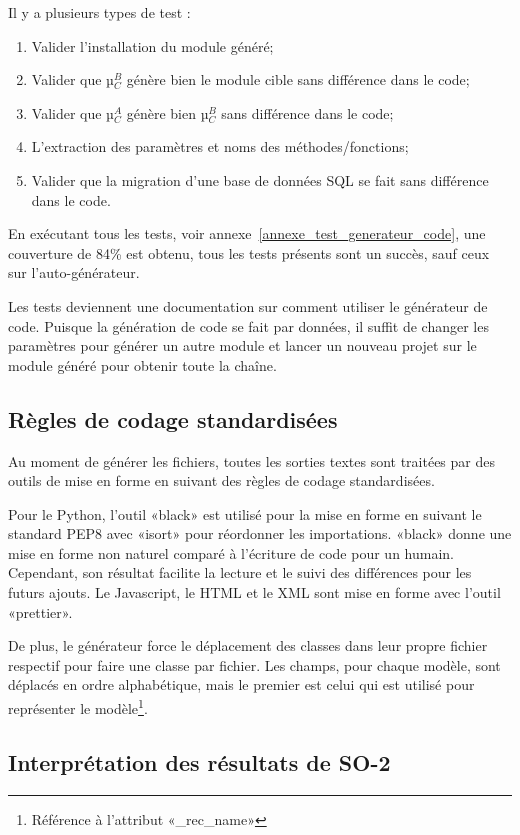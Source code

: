 Il y a plusieurs types de test : 
\begin{enumerate}
    \item Valider l’installation du module généré;
    \item Valider que µ$_C^B$ génère bien le module cible sans différence dans le code;
    \item Valider que µ$_C^A$ génère bien µ$_C^B$ sans différence dans le code;
    \item L’extraction des paramètres et noms des méthodes/fonctions;
    \item Valider que la migration d’une base de données SQL se fait sans différence dans le code.
\end{enumerate}

En exécutant tous les tests, voir annexe~\ref{annexe_test_generateur_code}, une couverture de 84\% est obtenu, tous les tests présents sont un succès, sauf ceux sur l’auto-générateur.

Les tests deviennent une documentation sur comment utiliser le générateur de code. Puisque la génération de code se fait par données, il suffit de changer les paramètres pour générer un autre module et lancer un nouveau projet sur le module généré pour obtenir toute la chaîne.

\subsection {Règles de codage standardisées}

Au moment de générer les fichiers, toutes les sorties textes sont traitées par des outils de mise en forme en suivant des règles de codage standardisées.

Pour le Python, l’outil «black» est utilisé pour la mise en forme en suivant le standard PEP8 avec «isort» pour réordonner les importations. «black» donne une mise en forme non naturel comparé à l’écriture de code pour un humain. Cependant, son résultat facilite la lecture et le suivi des différences pour les futurs ajouts. Le Javascript, le HTML et le XML sont mise en forme avec l’outil «prettier».

De plus, le générateur force le déplacement des classes dans leur propre fichier respectif pour faire une classe par fichier. Les champs, pour chaque modèle, sont déplacés en ordre alphabétique, mais le premier est celui qui est utilisé pour représenter le modèle\footnote{Référence à l'attribut «\_rec\_name»}.

\subsection{Interprétation des résultats de SO-2}

